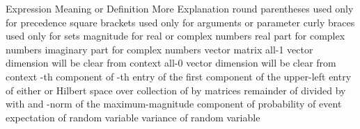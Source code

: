 \starttitle [title={Notation}]

\starttable[|l|l|l|] \HL
\NC Expression \VL Meaning or Definition \VL More Explanation \SR \HL
\NC {} \VL round parentheses \VL used only for precedence \AR \HL
\NC {} \VL square brackets \VL used only for arguments or parameter \AR \HL
\NC {} \VL curly braces \VL used only for sets \AR \HL
\NC {} \VL magnitude \VL for real or complex numbers \AR \HL
\NC {} \VL real part \VL for complex numbers \AR \HL
\NC {} \VL imaginary part \VL for complex numbers \AR \HL
\NC {} \VL vector \VL \AR \HL
\NC {} \VL matrix \VL \AR \HL
\NC {} \VL all-1 vector \VL dimension will be clear from context \AR \HL
\NC {} \VL all-0 vector \VL dimension will be clear from context \AR \HL
\NC {} \VL {}-th component of  \VL \AR \HL
\NC {} \VL {}-th entry of  \VL \AR \HL
\NC {} \VL the first component of  \VL  \AR \HL
\NC {} \VL the upper-left entry of  \VL  \AR \HL
\NC {} \VL either  or  \VL  \AR \HL
\NC {} \VL Hilbert space  over  \VL  \AR \HL
\NC {} \VL collection of  by  matrices \VL  \AR \HL
\NC {} \VL remainder of  divided by  \VL with  and  \AR \HL
\NC {} \VL {}-norm of  \VL {} \AR \HL
\NC {} \VL the maximum-magnitude \VL  \AR
\NC  \VL component of  \VL  \AR \HL
\NC {} \VL probability of event  \VL  \AR \HL
\NC {} \VL expectation of random variable  \VL  \AR \HL
\NC {} \VL variance of random variable  \VL  \AR \HL
\stoptable

\stopchapter
